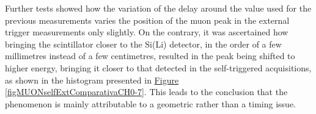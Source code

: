 \par
Further tests showed how the variation of the delay around the value used for the previous measurements varies the position of the muon peak in the external trigger measurements only slightly. On the contrary, it was ascertained how bringing the scintillator closer to the Si(Li) detector, in the order of a few millimetres instead of a few centimetres, resulted in the peak being shifted to higher energy, bringing it closer to that detected in the self-triggered acquisitions, as shown in the histogram presented in \hyperref[figMUONselfExtComparativaCH0-7]{Figure \ref{figMUONselfExtComparativaCH0-7}}. This leads to the conclusion that the phenomenon is mainly attributable to a geometric rather than a timing issue.